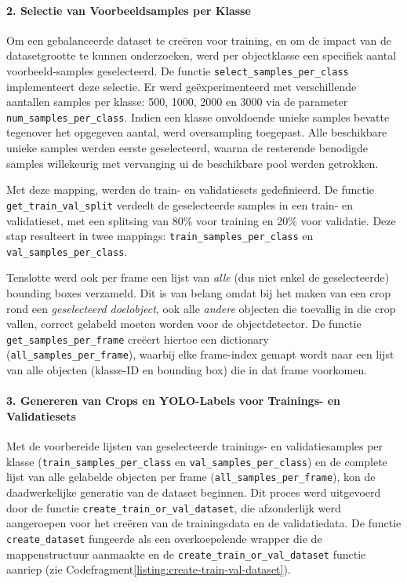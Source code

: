 \paragraph{2. Selectie van Voorbeeldsamples per Klasse}
Om een gebalanceerde dataset te creëren voor training, en om de impact van de datasetgrootte te kunnen onderzoeken, 
werd per objectklasse een specifiek aantal voorbeeld-samples geselecteerd. 
De functie \texttt{select\_samples\_per\_class} implementeert deze selectie. 
Er werd geëxperimenteerd met verschillende aantallen samples per klasse: 500, 1000, 2000 en 3000 via de parameter \texttt{num\_samples\_per\_class}.
Indien een klasse onvoldoende unieke samples bevatte tegenover het opgegeven aantal, werd oversampling toegepast.
Alle beschikbare unieke samples werden eerste geselecteerd, waarna de resterende benodigde samples willekeurig met vervanging ui de beschikbare pool werden getrokken.

Met deze mapping, werden de train- en validatiesets gedefinieerd.
De functie \texttt{get\_train\_val\_split} verdeelt de geselecteerde samples in een train- en validatieset,
met een splitsing van 80\% voor training en 20\% voor validatie.
Deze stap resulteert in twee mappings: \texttt{train\_samples\_per\_class} en \texttt{val\_samples\_per\_class}.

Tenslotte werd ook per frame een lijst van \textit{alle} (dus niet enkel de geselecteerde) bounding boxes verzameld.
Dit is van belang omdat bij het maken van een crop rond een \textit{geselecteerd doelobject},
ook alle \textit{andere} objecten die toevallig in die crop vallen, correct gelabeld moeten worden voor de objectdetector.
De functie \texttt{get\_samples\_per\_frame} creëert hiertoe een dictionary (\texttt{all\_samples\_per\_frame}), 
waarbij elke frame-index gemapt wordt naar een lijst van alle objecten (klasse-ID en bounding box) die in dat frame voorkomen.

\paragraph{3. Genereren van Crops en YOLO-Labels voor Trainings- en Validatiesets}
Met de voorbereide lijsten van geselecteerde trainings- en validatiesamples per 
klasse (\texttt{train\_samples\_per\_class} en \texttt{val\_samples\_per\_class}) 
en de complete lijst van alle gelabelde objecten per frame (\texttt{all\_samples\_per\_frame}), 
kon de daadwerkelijke generatie van de dataset beginnen. 
Dit proces werd uitgevoerd door de functie \texttt{create\_train\_or\_val\_dataset}, 
die afzonderlijk werd aangeroepen voor het creëren van de trainingsdata en de validatiedata. 
De functie \texttt{create\_dataset} fungeerde als een overkoepelende wrapper die de mappenstructuur 
aanmaakte en de \texttt{create\_train\_or\_val\_dataset} functie aanriep (zie Codefragment{\ref{listing:create-train-val-dataset}}).

